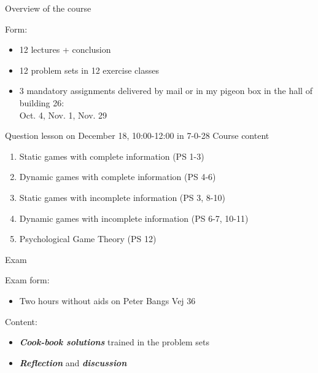 \begin{frame}{Overview of the course}
\begin{multicols}{2}
\color{lightgray}
Form:
\begin{itemize}\color{lightgray}
  \item[\textcolor{lightgray}{\textbullet}] 12 lectures + conclusion
  \item[\textcolor{lightgray}{\textbullet}] 12 problem sets in 12 exercise classes
  \item[\textcolor{lightgray}{\textbullet}] 3 mandatory assignments delivered by mail or in my pigeon box in the hall of building 26: \\
  Oct. 4, Nov. 1, Nov. 29
\end{itemize}
Question lesson on December 18, 10:00-12:00 in 7-0-28
\vfill\null \columnbreak
\color{black}
Course content
\begin{enumerate}
  \item Static games with complete information (PS 1-3)
  \item Dynamic games with complete information (PS 4-6)
  \item Static games with incomplete information (PS 3, 8-10)
  \item Dynamic games with incomplete information (PS 6-7, 10-11)
  \item Psychological Game Theory (PS 12)
\end{enumerate}
\vfill\null
\end{multicols}
\end{frame}

\begin{frame}{Exam}
\begin{multicols}{2}
Exam form:
\begin{itemize}
  \item Two hours without aids on Peter Bangs Vej 36
\end{itemize}
Content:
\begin{itemize}
  \item \textit{\textbf{Cook-book solutions}} trained in the problem sets
  \item \textit{\textbf{Reflection}} and \textit{\textbf{discussion}}
\end{itemize}
\vfill\null \columnbreak
\vfill\null
\end{multicols}
\end{frame}

